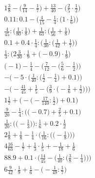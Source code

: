 \documentclass[8pt]{article}
\begin{document}
\begin{align}
1\frac{3}{8} - \big(\frac{9}{14} - \frac{1}{7}\big) + \frac{13}{40} - \big(\frac{2}{5} \cdot \frac{1}{2}\big) \\
0.11 : 0.1 - \Big(\frac{4}{15} - \frac{1}{4} : \big(1 \cdot \frac{1}{6}\big)\Big) \\
\frac{4}{45} : \big(\frac{1}{80} : \frac{1}{8}\big) + \frac{1}{63} : \big(\frac{1}{56} + \frac{1}{8}\big) \\
0.1 + 0.4 \cdot \frac{1}{4} : \Big(\frac{1}{30} : \big(\frac{1}{42} + \frac{1}{7}\big)\Big) \\
\frac{1}{3} : \Big(2\frac{3}{30} \cdot \frac{1}{9} + \big(-0.9\big) \cdot \frac{1}{9}\Big) \\
\Big(-1\Big) - \frac{1}{4} - \Big(\frac{7}{12} - \big(\frac{5}{6} - \frac{1}{2}\big)\Big) \\
-\bigg(-5 \cdot \Big(\frac{1}{40} : \big(\frac{1}{2} - \frac{1}{4}\big) + 0.1\Big)\bigg) \\
-\bigg(-\frac{41}{45} + \frac{1}{5} - \Big(\frac{3}{9} \cdot \big(-\frac{1}{6} + \frac{1}{2}\big)\Big)\bigg) \\
1\frac{1}{7} + \Big(-\big(-\frac{17}{140} : \frac{1}{2}\big) + 0.1\Big) \\
\frac{9}{20} - \frac{1}{4} : \Big(\big(-0.7\big) + \frac{2}{5} + 0.1\Big) \\
\frac{1}{20} : \Big(\big(-\frac{1}{3}\big)\Big) : \frac{1}{6} + 0.2 \cdot \frac{1}{2} \\
2\frac{1}{8} + \frac{1}{8} - \frac{1}{4} \cdot \bigg(\frac{1}{16} : \Big(\big(-\frac{1}{8}\big)\Big)\bigg) \\
4\frac{16}{63} - \frac{1}{7} + \frac{1}{3} \cdot \frac{1}{5} + -\frac{1}{18} + \frac{1}{6} \\
88.9 + 0.1 \cdot \bigg(\frac{14}{45} - \Big(\frac{1}{40} : \big(\frac{3}{8} - \frac{1}{4}\big)\Big)\bigg) \\
6\frac{9}{42} \cdot \frac{1}{9} + \frac{1}{6} - \big(-\frac{1}{49} : \frac{1}{7}\big)
\end{align}
\end{document}
